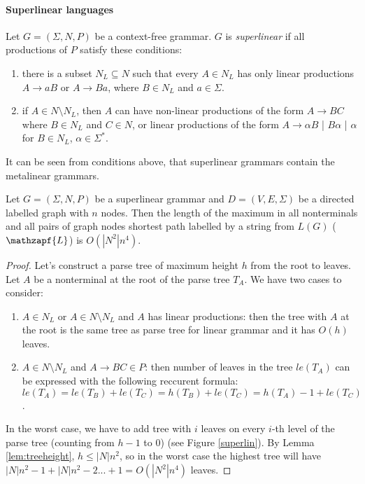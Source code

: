 \paragraph{Superlinear languages}
Let $G = (\Sigma, N, P)$ be a context-free grammar. $G$ is \textit{superlinear} if all productions of $P$ satisfy these conditions:
\begin{enumerate}
\item there is a subset $N_L \subseteq N$ such that every $A \in N_L$ has only linear productions $A\rightarrow aB$ or $A\rightarrow Ba$, where $B \in N_L$ and $a \in \Sigma$.
\item if $A \in N \setminus N_L$, then $A$ can have non-linear productions of the form $A \rightarrow BC$ where $B\in N_L$ and $C \in N$, or linear productions of the form $A\rightarrow \alpha B$ | $B \alpha$ | $\alpha$ for $B \in N_L$, $\alpha \in \Sigma^*$.
\end{enumerate}


It can be seen from conditions above, that superlinear grammars contain the metalinear grammars.
\begin{lemma}
\label{superlin}
Let  $G = (\Sigma, N, P)$ be a superlinear grammar and $D=(V, E, \Sigma)$ be a directed labelled graph with $n$ nodes. Then the length of the maximum in all nonterminals and all pairs of graph nodes shortest path labelled by a string from $L(G)$ ($\mathzapf{L}$) is $O(|N^2|n^4)$.
\end{lemma}
\begin{proof}
Let's construct a parse tree of maximum height $h$ from the root to leaves. Let $A$ be a nonterminal at the root of the parse tree $T_A$. We have two cases to consider:
\begin{enumerate}
\item  $A \in N_L$ or $A \in N \setminus N_L$ and $A$ has linear productions: then the tree with $A$ at the root is the same tree as parse tree for linear grammar and it has $O(h)$ leaves.
\item  $A \in N \setminus N_L$ and $A \rightarrow BC \in P$: then number of leaves in the tree $le(T_A)$ can be expressed with the following reccurent formula: $le(T_A) = le(T_B) + le(T_C) = h(T_B) + le(T_C) = h(T_A) - 1 + le(T_C)$.
\end{enumerate}
In the worst case, we have to add tree with $i$ leaves on every $i$-th level of the parse tree (counting from $h-1$ to 0) (see Figure \ref{superlin}). By Lemma  \ref{lem:treeheight}, $h \le |N|n^2$, so in the worst case the highest tree will have $|N|n^2-1 + |N|n^2 - 2 ... + 1 = O(|N^2|n^4)$ leaves.
\end{proof}


